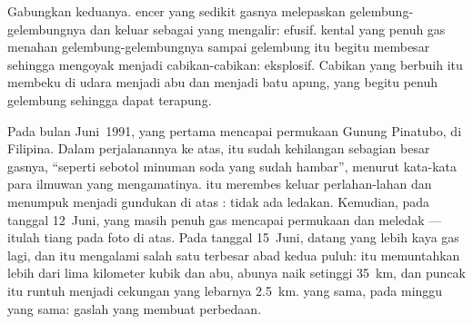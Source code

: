 Gabungkan keduanya.  encer yang sedikit gasnya melepaskan
gelembung-gelembungnya dan keluar sebagai  yang mengalir: 
efusif.  kental yang penuh gas menahan gelembung-gelembungnya sampai
gelembung itu begitu membesar sehingga mengoyak  menjadi
cabikan-cabikan:  eksplosif. Cabikan  yang berbuih itu
membeku di udara menjadi abu dan menjadi batu apung,  yang begitu
penuh gelembung sehingga dapat terapung.

\begin{example}\label{ex:g7:volcanoes:pinatubo}
Pada bulan Juni~1991,  yang pertama mencapai permukaan Gunung
Pinatubo, di Filipina. Dalam perjalanannya ke atas,  itu sudah
kehilangan sebagian besar gasnya, ``seperti sebotol minuman soda yang sudah
hambar'', menurut kata-kata para ilmuwan yang mengamatinya.  itu
merembes keluar perlahan-lahan dan menumpuk menjadi gundukan di atas : tidak ada ledakan. Kemudian, pada tanggal 12~Juni,  yang
masih penuh gas mencapai permukaan dan meledak --- itulah tiang 
pada foto di atas. Pada tanggal 15~Juni, datang  yang lebih kaya gas
lagi, dan  itu mengalami salah satu  terbesar abad kedua
puluh:  itu memuntahkan lebih dari lima kilometer kubik  dan
abu,  abunya naik setinggi \qty{35}{km}, dan puncak  itu runtuh
menjadi cekungan yang lebarnya \qty{2.5}{km}.  yang sama, pada
minggu yang sama: gaslah yang membuat perbedaan.
\end{example}

